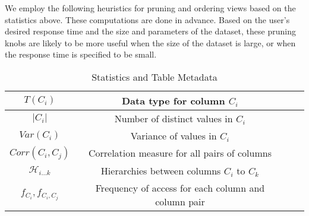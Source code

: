 We employ the following heuristics for pruning and ordering views based on the
statistics above.
These computations are done in advance. Based on the user's desired
response time and the size and parameters of the dataset, these pruning knobs
are likely to be more useful when the size of the dataset is large, or when
the response time is specified to be small.


\begin{table}
{\scriptsize \center
\vspace{-10pt}
\begin{tabular}{|c|c|c|c|}
\hline
$T(C_i)$ & Data type for column $C_i$ \\ \hline
$|C_i|$ & Number of distinct values in $C_i$ \\
\hline $Var(C_i)$ & Variance of values in $C_i$ \\ \hline
$Corr(C_i, C_j)$ & Correlation measure for all pairs of columns \\ \hline
$\mathcal{H}_{i\ldots k}$ & Hierarchies between columns $C_i$ to $C_k$ \\ \hline
$f_{C_i}, f_{C_i, C_j}$ & Frequency of access for each column and column pair \\
\hline
\end{tabular} 
\vspace{-10pt}
\caption{Statistics and Table Metadata \label{tab:statistics}}
}
\end{table}

